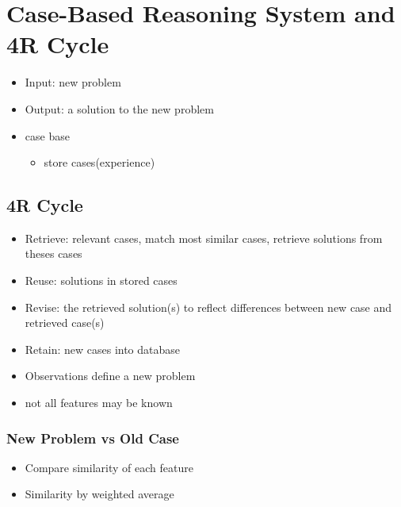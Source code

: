 \section{Case-Based Reasoning System and 4R Cycle}
\begin{itemize}
\item Input: new problem
\item Output: a solution to the new problem
\item case base
\begin{itemize}
\item store cases(experience)
\end{itemize}
\end{itemize}

\subsection{4R Cycle}
\begin{itemize}
\item Retrieve: relevant cases, match most similar cases, retrieve solutions from theses cases
\item Reuse: solutions in stored cases
\item Revise: the retrieved solution(s) to reflect differences between new case and retrieved case(s)
\item Retain: new cases into database
\end{itemize}

\begin{itemize}
\item Observations define a new problem
\item not all features may be known
\end{itemize}

\subsubsection{New Problem vs Old Case}
\begin{itemize}
\item Compare similarity of each feature
\item Similarity by weighted average
\end{itemize}